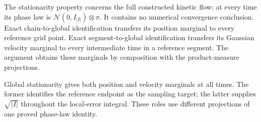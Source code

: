 \documentclass[11pt,a4paper]{article}
\begin{document}
The stationarity property concerns the full constructed kinetic flow: at every time its phase law is \(\mathcal N(0,I_{|I|})\otimes\pi\). It contains no numerical convergence conclusion. Exact chain-to-global identification transfers its position marginal to every reference grid point. Exact segment-to-global identification transfers its Gaussian velocity marginal to every intermediate time in a reference segment. The argument obtains these marginals by composition with the product-measure projections.



Global stationarity gives both position and velocity marginals at all times. The former identifies the reference endpoint as the sampling target; the latter supplies \(\sqrt{|I|}\) throughout the local-error integral. These roles use different projections of one proved phase-law identity.
\end{document}
